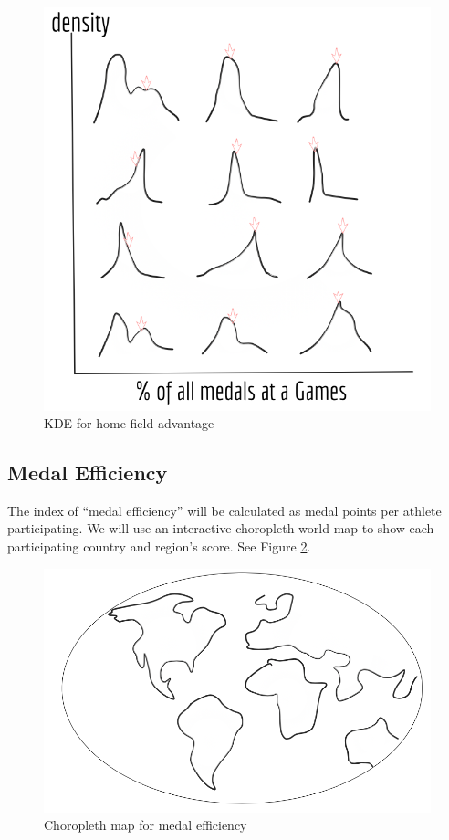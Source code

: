 \documentclass[
]{article}
\begin{document}
\begin{figure}

{\centering \includegraphics[width=0.75\linewidth]{static/pics/6} 

}

\caption{KDE for home-field advantage}\label{fig:figure17}
\end{figure}

\hypertarget{plans-medal-efficiency}{%
\subsection{Medal Efficiency}\label{plans-medal-efficiency}}

The index of ``medal efficiency'' will be calculated as medal points per athlete participating. We will use an interactive choropleth world map to show each participating country and region's score. See Figure \ref{fig:figure18}.

\begin{figure}

{\centering \includegraphics[width=0.95\linewidth]{static/pics/9} 

}

\caption{Choropleth map for medal efficiency}\label{fig:figure18}
\end{figure}
\end{document}
